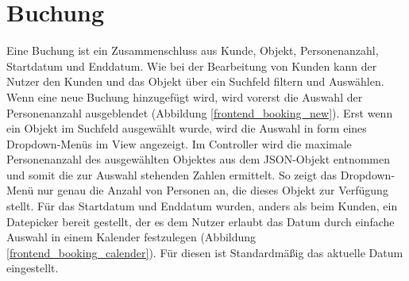 \section{Buchung}
Eine Buchung ist ein Zusammenschluss aus Kunde, Objekt, Personenanzahl, Startdatum und Enddatum. Wie bei der Bearbeitung von Kunden kann der Nutzer den Kunden und das Objekt über ein Suchfeld filtern und Auswählen.
Wenn eine neue Buchung hinzugefügt wird, wird vorerst die Auswahl der Personenanzahl ausgeblendet (Abbildung \ref{frontend_booking_new}).
Erst wenn ein Objekt im Suchfeld ausgewählt wurde, wird die Auswahl in form eines Dropdown-Menüs im View angezeigt.
Im Controller wird die maximale Personenanzahl des ausgewählten Objektes aus dem JSON-Objekt entnommen und somit die zur Auswahl stehenden Zahlen ermittelt. So zeigt das Dropdown-Menü nur genau die Anzahl von Personen an, die dieses Objekt zur Verfügung stellt.
Für das Startdatum und Enddatum wurden, anders als beim Kunden, ein Datepicker bereit gestellt, der es dem Nutzer erlaubt das Datum durch einfache Auswahl in einem Kalender festzulegen (Abbildung \ref{frontend_booking_calender}). Für diesen ist Standardmäßig das aktuelle Datum eingestellt.

